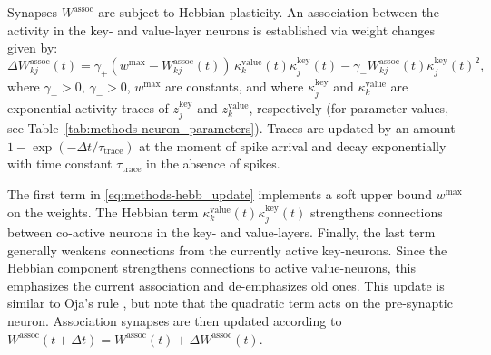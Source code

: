 \documentclass{article}
\begin{document}
Synapses $W^{\mathrm{assoc}}$ are subject to Hebbian plasticity. An association between the activity in the key- and value-layer neurons is established via weight changes given by:
\begin{equation}
    \label{eq:methods-hebb_update}
    \Delta W_{kj}^{\mathrm{assoc}}(t) = \gamma_+ (w^{\mathrm{max}} - W_{kj}^{\mathrm{assoc}}(t))\,\kappa_k^{\mathrm{value}}(t) \kappa_j^{\mathrm{key}}(t) - \gamma_- W_{kj}^{\mathrm{assoc}}(t) \kappa_j^{\mathrm{key}}(t)^2,
\end{equation}
where $\gamma_+ > 0$, $\gamma_- > 0$, $w^{\mathrm{max}}$ are constants, and where $\kappa_j^{\mathrm{key}}$ and $\kappa_k^{\mathrm{value}}$ are exponential activity traces of $z_j^{\mathrm{key}}$ and $z_k^{\mathrm{value}}$, respectively (for parameter values, see Table~\ref{tab:methods-neuron_parameters}). Traces are updated by an amount $1 - \exp(-\Delta t/\tau_{\mathrm{trace}})$ at the moment of spike arrival and decay exponentially with time constant $\tau_{\mathrm{trace}}$ in the absence of spikes.

The first term in \eqref{eq:methods-hebb_update} implements a soft upper bound $w^{\mathrm{max}}$ on the weights. The Hebbian term $\kappa_k^{\mathrm{value}}(t)\kappa_j^{\mathrm{key}}(t)$ strengthens connections between co-active neurons in the key- and value-layers. Finally, the last term generally weakens connections from the currently active key-neurons. Since the Hebbian component strengthens connections to active value-neurons, this emphasizes the current association and de-emphasizes old ones. This update is similar to Oja's rule \cite{oja1982simplified}, but note that the quadratic term acts on the pre-synaptic neuron. Association synapses are then updated according to $W^{\mathrm{assoc}}(t + \Delta t) = W^{\mathrm{assoc}}(t) + \Delta W^{\mathrm{assoc}}(t)$.
\end{document}
